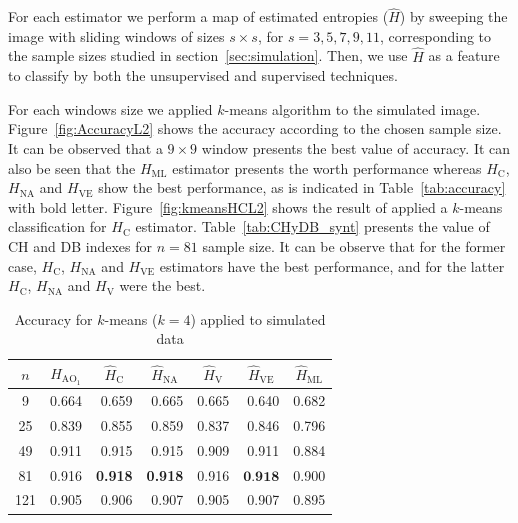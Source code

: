 \documentclass[journal]{IEEEtran}
\begin{document}

For each estimator we perform a map of estimated entropies ($\widehat{H}$) by sweeping the image with sliding windows of sizes $s\times s$, for $s=3,5,7,9,11$, corresponding to the sample sizes studied in section~\ref{sec:simulation}. Then, we use $\widehat{H}$ as a feature to classify by both the unsupervised and supervised techniques.

For each windows size we applied $k$-means algorithm to the simulated image. Figure~\ref{fig:AccuracyL2} shows the accuracy according to the chosen sample size. It can be observed that a $9 \times 9$ window presents the best value of accuracy. It can also be seen that the $H_{\text{ML}}$ estimator presents the worth performance whereas $H_\text{C}$, $H_{\text{NA}}$ and $H_{\text{VE}}$ show the best performance, as is indicated in Table~\ref{tab:accuracy} with bold letter. Figure~\ref{fig:kmeansHCL2} shows the result of applied a $k$-means classification for $H_\text{C}$ estimator. Table~\ref{tab:CHyDB_synt} presents the value of CH and DB indexes for $n=81$ sample size. It can be observe that for the former case, $H_\text{C}$, $H_{\text{NA}}$ and $H_{\text{VE}}$ estimators have the best performance, and for the latter $H_\text{C}$, $H_{\text{NA}}$ and $H_{\text{V}}$ were the best.

\begin{table}[htbp]
	\centering
	\caption{Accuracy for $k$-means ($k=4$) applied to simulated data}
	\label{tab:accuracy}
	\begin{tabular}{crrrrrr}
		\midrule
		$n$     & \multicolumn{1}{c}{$H_{{\text{AO}}_1}$} & \multicolumn{1}{c}{$\widehat{H}_\text{C}$} & \multicolumn{1}{c}{$\widehat{H}_{\text{NA}}$} & \multicolumn{1}{c}{$\widehat{H}_\text{V}$} & \multicolumn{1}{c}{$\widehat{H}_{\text{VE}}$} & \multicolumn{1}{c}{$\widehat{H}_{\text{ML}}$}\\
		\midrule
		9 & 0.664 & 0.659 & 0.665 & 0.665 & 0.640 & 0.682 \\
		25  & 0.839 & 0.855 & 0.859 & 0.837 & 0.846 & 0.796 \\
		49  & 0.911 & 0.915 & 0.915 & 0.909 & 0.911 & 0.884 \\
		81  & 0.916 & \textbf{0.918} & \textbf{0.918} & 0.916 & $\textbf{0.918}$ & 0.900 \\
		121 & 0.905 & 0.906 & 0.907 & 0.905 & 0.907 & 0.895 \\
		\bottomrule
	\end{tabular}%
	\label{tab:addlabel}%
\end{table}
\end{document}
